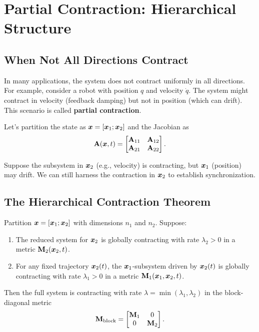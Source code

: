 \section{Partial Contraction: Hierarchical Structure}

\subsection{When Not All Directions Contract}

In many applications, the system does not contract uniformly in all directions. For
example, consider a robot with position $q$ and velocity $\dot{q}$. The system might
contract in velocity (feedback damping) but not in position (which can drift). This
scenario is called \textbf{partial contraction}.

Let's partition the state as $\bm{x} = [\bm{x}_1; \bm{x}_2]$ and the Jacobian as
\begin{equation}
\mathbf{A}(\bm{x},t) = \begin{bmatrix} \mathbf{A}_{11} & \mathbf{A}_{12} \\ \mathbf{A}_{21} & \mathbf{A}_{22} \end{bmatrix}.
\label{eq:ch4:block-jacobian}
\end{equation}

Suppose the subsystem in $\bm{x}_2$ (e.g., velocity) is contracting, but $\bm{x}_1$ (position)
may drift. We can still harness the contraction in $\bm{x}_2$ to establish synchronization.

\subsection{The Hierarchical Contraction Theorem}

\begin{theorem}
\label{thm:ch4:partial}
Partition $\bm{x} = [\bm{x}_1; \bm{x}_2]$ with dimensions $n_1$ and $n_2$. Suppose:
\begin{enumerate}
\item The reduced system for $\bm{x}_2$ is globally contracting with rate $\lambda_2 > 0$
      in a metric $\mathbf{M}_2(\bm{x}_2,t)$.
\item For any fixed trajectory $\bm{x}_2(t)$, the $\bm{x}_1$-subsystem driven by $\bm{x}_2(t)$ is
      globally contracting with rate $\lambda_1 > 0$ in a metric $\mathbf{M}_1(\bm{x}_1,\bm{x}_2,t)$.
\end{enumerate}
Then the full system is contracting with rate $\lambda = \min(\lambda_1, \lambda_2)$
in the block-diagonal metric
\begin{equation}
\mathbf{M}_{\text{block}} = \begin{bmatrix} \mathbf{M}_1 & 0 \\ 0 & \mathbf{M}_2 \end{bmatrix}.
\label{eq:ch4:block-metric}
\end{equation}
\end{theorem}

